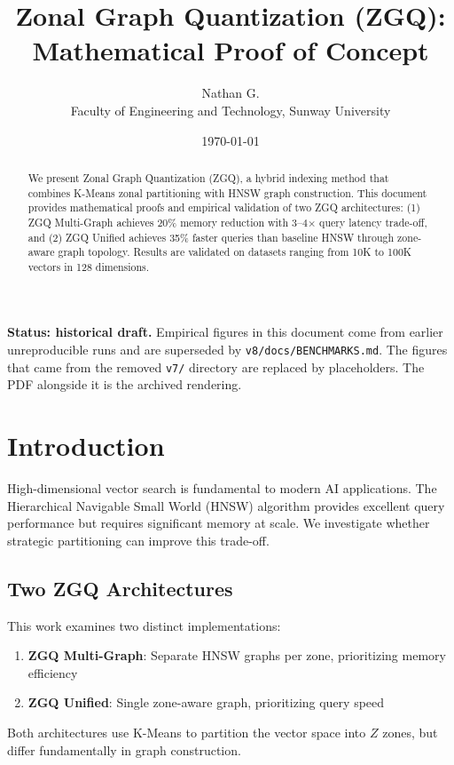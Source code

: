 \documentclass[11pt,a4paper]{article}
\title{\textbf{Zonal Graph Quantization (ZGQ):\\Mathematical Proof of Concept}}
\author{Nathan G.\\Faculty of Engineering and Technology, Sunway University}
\date{\today}
\begin{document}
\maketitle

\noindent\textbf{Status: historical draft.} Empirical figures in this document come from earlier unreproducible runs and are superseded by \texttt{v8/docs/BENCHMARKS.md}. The figures that came from the removed \texttt{v7/} directory are replaced by placeholders. The PDF alongside it is the archived rendering.


\begin{abstract}
We present Zonal Graph Quantization (ZGQ), a hybrid indexing method that combines K-Means zonal partitioning with HNSW graph construction. This document provides mathematical proofs and empirical validation of two ZGQ architectures: (1) ZGQ Multi-Graph achieves 20\% memory reduction with 3--4× query latency trade-off, and (2) ZGQ Unified achieves 35\% faster queries than baseline HNSW through zone-aware graph topology. Results are validated on datasets ranging from 10K to 100K vectors in 128 dimensions.
\end{abstract}

\section{Introduction}

High-dimensional vector search is fundamental to modern AI applications. The Hierarchical Navigable Small World (HNSW) algorithm provides excellent query performance but requires significant memory at scale. We investigate whether strategic partitioning can improve this trade-off.

\subsection{Two ZGQ Architectures}

This work examines two distinct implementations:

\begin{enumerate}
    \item \textbf{ZGQ Multi-Graph}: Separate HNSW graphs per zone, prioritizing memory efficiency
    \item \textbf{ZGQ Unified}: Single zone-aware graph, prioritizing query speed
\end{enumerate}

Both architectures use K-Means to partition the vector space into $Z$ zones, but differ fundamentally in graph construction.
\end{document}
